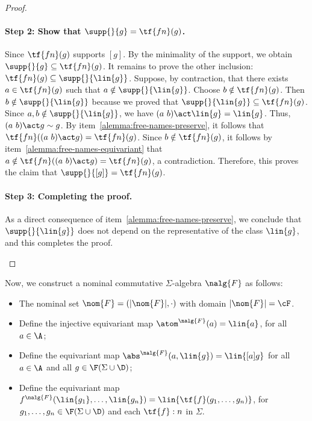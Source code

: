 \begin{proof}
\begin{enumerate}
        
        \paragraph*{Step 2: Show that $\supp{}{g} = \tf{fn}(g)$.} Since $\tf{fn}(g)$ supports $[g]$. By the minimality of the support, we obtain $\supp{}{g} \subseteq \tf{fn}(g)$. It remains to prove the other inclusion: $\tf{fn}(g) \subseteq \supp{}{\lin{g}}$. Suppose, by contraction, that there exists $a\in \tf{fn}(g)$ such that $a\notin \supp{}{\lin{g}}$. Choose $b\notin \tf{fn}(g)$. Then $b\notin \supp{}{\lin{g}}$ because we proved that $\supp{}{\lin{g}} \subseteq \tf{fn}(g)$. Since $a,b \notin\supp{}{\lin{g}}$, we have $(a \ b)\act \lin{g} = \lin{g}$. Thus, $(a \ b)\act g \sim g$. By item~\ref{alemma:free-names-preserve}, it follows that $\tf{fn}((a \ b)\act g) = \tf{fn}(g)$. Since $b\notin \tf{fn}(g)$, it follows by item~\ref{alemma:free-names-equivariant} that $a\notin \tf{fn}((a \ b)\act g) = \tf{fn}(g)$, a contradiction. Therefore, this proves the claim that $\supp{}{[g]} = \tf{fn}(g)$.

        \paragraph*{Step 3: Completing the proof.}

        As a direct consequence of item~\ref{alemma:free-names-preserve}, we conclude that $\supp{}{\lin{g}}$ does not  depend on the representative of the class $\lin{g}$, and this completes the proof.
\end{enumerate}
\end{proof}

Now, we construct a nominal commutative $\Sigma$-algebra  $\nalg{F}$ as follows:

\begin{itemize}
    \item The nominal set $\nom{F}=(|\nom{F}|, \cdot )$ with domain $|\nom{F}|=\cF$.
     \item Define the injective equivariant map $\atom^{\nalg{F}}(a) = \lin{a}$, for all $a\in \A$;
        \item Define the equivariant map $\abs^{\nalg{F}}(a,\lin{g}) = \lin{[a]g}$ for all $a\in\A$ and all $g\in \F(\Sigma\cup \D)$;
        \item Define the equivariant map
        $f^{\nalg{F}}(\lin{g_1},\ldots,\lin{g_n}) = \lin{\tf{f}(g_1,\ldots,g_n)}$,  for $g_1,\ldots,g_n \in \F(\Sigma\cup \D)$ and each $\tf{f}:n$ in $\Sigma$.
\end{itemize}

